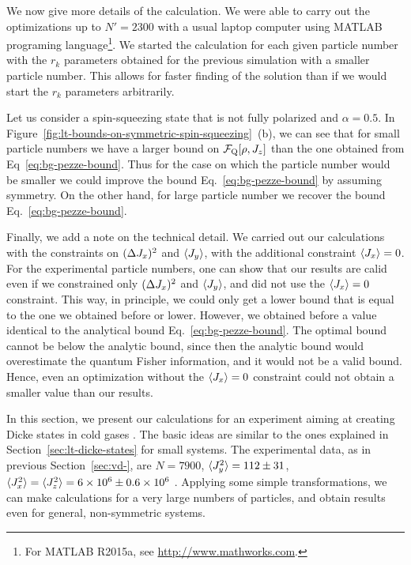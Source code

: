 We now give more details of the calculation. We were able to carry out the optimizations up to $N'=2300$ with a usual laptop computer using MATLAB programing language\footnote{
For MATLAB R2015a, see \url{http://www.mathworks.com}.}.
We started the calculation for each given particle number with the $r_k$ parameters obtained for the previous simulation with a smaller particle number.
This allows for faster finding of the solution than if we would start the $r_k$ parameters arbitrarily.

Let us consider a spin-squeezing state that is not fully polarized and $\alpha=0.5$.
In Figure~\ref{fig:lt-bounds-on-symmetric-spin-squeezing}~(b), we can see that for small particle numbers we have a larger bound on $\mathcal{F}_{\textnormal{Q}}[\rho, J_z]$ than the one obtained from Eq~\eqref{eq:bg-pezze-bound}.
Thus for the case on which the particle number would be smaller we could improve the bound Eq.~\eqref{eq:bg-pezze-bound} by assuming symmetry.
On the other hand, for large particle number we recover the bound Eq.~\eqref{eq:bg-pezze-bound}.

Finally, we add a note on the technical detail.
We carried out our calculations with the constraints on $(\Delta J_x )^2$ and $\langle J_y \rangle$, with the additional constraint $\langle J_x \rangle=0$.
For the experimental particle numbers, one can show that our results are calid even if we constrained only $(\Delta J_x )^2$ and $\langle J_y \rangle$, and did not use the $\langle J_x \rangle=0$ constraint.
This way, in principle, we could only get a lower bound that is equal to the one we obtained before or lower.
However, we obtained before a value identical to the analytical bound Eq.~\eqref{eq:bg-pezze-bound}.
The optimal bound cannot be below the analytic bound, since then the analytic bound would overestimate the quantum Fisher information, and it would not be a valid bound.
Hence, even an optimization without the $\langle J_x \rangle=0$ constraint could not obtain a smaller value than our results.


In this section, we present our calculations for an experiment aiming at creating Dicke states in cold gases \citep{Luecke2014}.
The basic ideas are similar to the ones explained in Section~\ref{sec:lt-dicke-states} for small systems.
The experimental data, as in previous Section~\ref{sec:vd-}, are $N=7900$, $\langle J_y^2 \rangle=112\pm31$, $\langle J_x^2 \rangle=\langle J_z^2 \rangle=6\times10^6\pm0.6\times10^6$ \citep{Apellaniz2015}.
Applying some simple transformations, we can make calculations for a very large numbers of particles, and obtain results even for general, non-symmetric systems.

